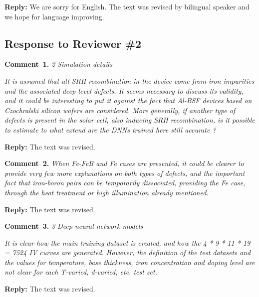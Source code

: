 \documentclass[num-refs]{wiley-article} %
\begin{document}
\vspace{0.5cm}
\noindent
\textcolor[rgb]{0.51,0.00,0.00}{\textbf{Reply:}}
We are sorry for English.
The text was revised by bilingual speaker and we hope for language improving.




\subsection*{Response to Reviewer \#2 }


\textcolor[rgb]{0.00,0.50,1.00}{\textbf{Comment~1.}}
\emph{2 Simulation details}

\emph{It is assumed that all SRH recombination in the device come from iron impurities and the associated deep level defects.
It seems necessary to discuss its validity, and it could be interesting to put it against the fact that Al-BSF devices based on Czochralski silicon wafers are considered.
More generally, if another type of defects is present in the solar cell, also inducing SRH recombination,
is it possible to estimate to what extend are the DNNs trained here still accurate ? }

\vspace{0.5cm}
\noindent
\textcolor[rgb]{0.51,0.00,0.00}{\textbf{Reply:}}
The text was revised.


\vspace{1cm}
\noindent
\textcolor[rgb]{0.00,0.50,1.00}{\textbf{Comment~2.}}
\emph{When Fe-FeB and Fe cases are presented, it could be clearer to provide very few more explanations on both types of defects,
and the important fact that iron-boron pairs can be temporarily dissociated, providing the Fe case,
through the heat treatment or high illumination already mentioned. }

\vspace{0.5cm}
\noindent
\textcolor[rgb]{0.51,0.00,0.00}{\textbf{Reply:}}
The text was revised.

\vspace{1cm}
\noindent
\textcolor[rgb]{0.00,0.50,1.00}{\textbf{Comment~3.}}
\emph{3 Deep neural network models}

\emph{
It is clear how the main training dataset is created, and how the 4 * 9 * 11 * 19 = 7524 IV curves are generated.
However, the definition of the test datasets and the values for temperature,
base thickness, iron concentration and doping level are not clear for each T-varied, d-varied, etc. test set. }

\vspace{0.5cm}
\noindent
\textcolor[rgb]{0.51,0.00,0.00}{\textbf{Reply:}}
The text was revised.
\end{document}
